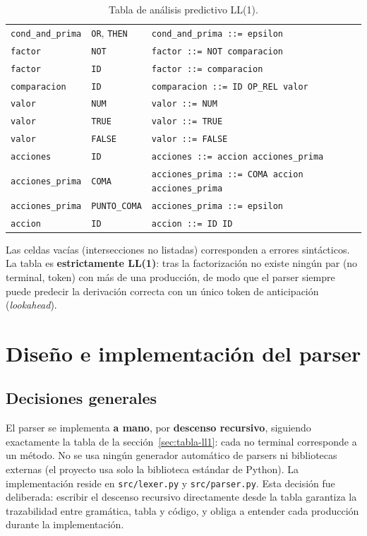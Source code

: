 \documentclass[12pt,a4paper]{article}
\begin{document}
\begin{table}[h!]
\begin{tabular}{lll}
\texttt{cond\_and\_prima}    & \texttt{OR}, \texttt{THEN} & \texttt{cond\_and\_prima ::= epsilon} \\
\texttt{factor}              & \texttt{NOT}          & \texttt{factor ::= NOT comparacion} \\
\texttt{factor}              & \texttt{ID}           & \texttt{factor ::= comparacion} \\
\texttt{comparacion}         & \texttt{ID}           & \texttt{comparacion ::= ID OP\_REL valor} \\
\texttt{valor}               & \texttt{NUM}          & \texttt{valor ::= NUM} \\
\texttt{valor}               & \texttt{TRUE}         & \texttt{valor ::= TRUE} \\
\texttt{valor}               & \texttt{FALSE}        & \texttt{valor ::= FALSE} \\
\texttt{acciones}            & \texttt{ID}           & \texttt{acciones ::= accion acciones\_prima} \\
\texttt{acciones\_prima}     & \texttt{COMA}         & \texttt{acciones\_prima ::= COMA accion acciones\_prima} \\
\texttt{acciones\_prima}     & \texttt{PUNTO\_COMA}  & \texttt{acciones\_prima ::= epsilon} \\
\texttt{accion}              & \texttt{ID}           & \texttt{accion ::= ID ID} \\
\bottomrule
\end{tabular}
\caption{Tabla de análisis predictivo LL(1).}
\label{tab:ll1}
\end{table}

Las celdas vacías (intersecciones no listadas) corresponden a errores
sintácticos. La tabla es \textbf{estrictamente LL(1)}: tras la factorización
no existe ningún par (no terminal, token) con más de una producción, de modo
que el parser siempre puede predecir la derivación correcta con un único
token de anticipación (\emph{lookahead}).

\section{Diseño e implementación del parser}

\subsection{Decisiones generales}
El parser se implementa \textbf{a mano}, por \textbf{descenso recursivo},
siguiendo exactamente la tabla de la sección~\ref{sec:tabla-ll1}: cada no
terminal corresponde a un método. No se usa ningún generador automático de
parsers ni bibliotecas externas (el proyecto usa solo la biblioteca estándar
de Python). La implementación reside en \texttt{src/lexer.py} y
\texttt{src/parser.py}. Esta decisión fue deliberada: escribir el descenso
recursivo directamente desde la tabla garantiza la trazabilidad entre
gramática, tabla y código, y obliga a entender cada producción durante la
implementación.
\end{document}
